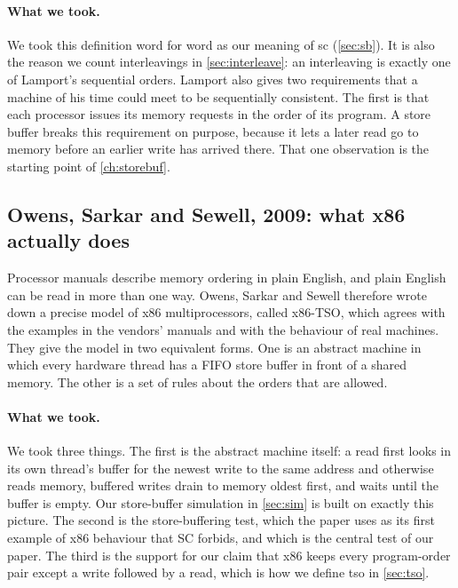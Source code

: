 \paragraph{What we took.} We took this definition word for word as our meaning of \gls{sc} (\cref{sec:sb}). It is also the reason we count interleavings in \cref{sec:interleave}: an interleaving is exactly one of Lamport's sequential orders. Lamport also gives two requirements that a machine of his time could meet to be sequentially consistent. The first is that each processor issues its memory requests in the order of its program. A store buffer breaks this requirement on purpose, because it lets a later read go to memory before an earlier write has arrived there. That one observation is the starting point of \cref{ch:storebuf}.

\subsection{Owens, Sarkar and Sewell, 2009: what x86 actually does}
\label{sec:owens}

Processor manuals describe memory ordering in plain English, and plain English can be read in more than one way. Owens, Sarkar and Sewell\cite{owens2009better} therefore wrote down a precise model of x86 multiprocessors, called x86-TSO, which agrees with the examples in the vendors' manuals and with the behaviour of real machines. They give the model in two equivalent forms. One is an abstract machine in which every hardware thread has a FIFO store buffer in front of a shared memory. The other is a set of rules about the orders that are allowed.

\paragraph{What we took.} We took three things. The first is the abstract machine itself: a read first looks in its own thread's buffer for the newest write to the same address and otherwise reads memory, buffered writes drain to memory oldest first, and  waits until the buffer is empty. Our store-buffer simulation in \cref{sec:sim} is built on exactly this picture. The second is the store-buffering test, which the paper uses as its first example of x86 behaviour that SC forbids, and which is the central test of our paper. The third is the support for our claim that x86 keeps every program-order pair except a write followed by a read, which is how we define \gls{tso} in \cref{sec:tso}.

